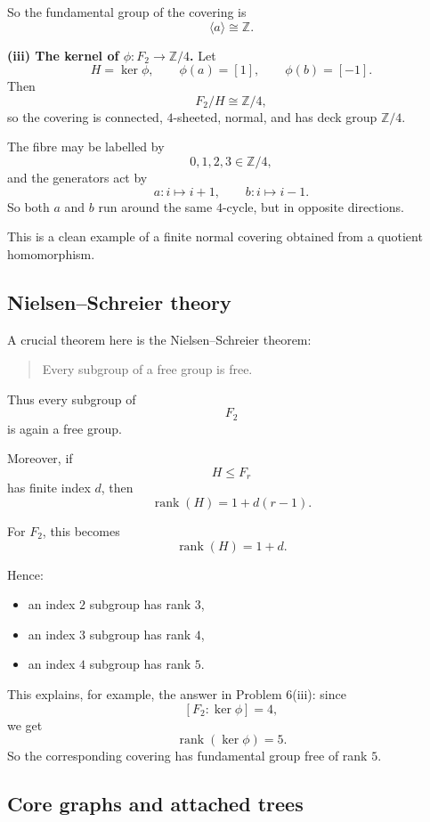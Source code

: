 \documentclass[12pt,a4paper]{article}
\theoremstyle{notespace}
\begin{document}
So the fundamental group of the covering is
\[
\langle a\rangle\cong \mathbb Z.
\]

\medskip

\textbf{(iii) The kernel of \(\phi:F_2\to \mathbb Z/4\).}
Let
\[
H=\ker\phi,
\qquad
\phi(a)=[1],\qquad \phi(b)=[-1].
\]
Then
\[
F_2/H\cong \mathbb Z/4,
\]
so the covering is connected, \(4\)-sheeted, normal, and has deck group \(\mathbb Z/4\).

The fibre may be labelled by
\[
0,1,2,3\in \mathbb Z/4,
\]
and the generators act by
\[
a:i\mapsto i+1,\qquad b:i\mapsto i-1.
\]
So both \(a\) and \(b\) run around the same \(4\)-cycle, but in opposite directions.

This is a clean example of a finite normal covering obtained from a quotient homomorphism.

\bigskip

\subsection{ Nielsen--Schreier theory}

A crucial theorem here is the Nielsen--Schreier theorem:
\begin{quote}
	Every subgroup of a free group is free.
\end{quote}

Thus every subgroup of
\[
F_2
\]
is again a free group.

Moreover, if
\[
H\leq F_r
\]
has finite index \(d\), then
\[
\operatorname{rank}(H)=1+d(r-1).
\]

For \(F_2\), this becomes
\[
\operatorname{rank}(H)=1+d.
\]

Hence:
\begin{itemize}
	\item an index \(2\) subgroup has rank \(3\),
	\item an index \(3\) subgroup has rank \(4\),
	\item an index \(4\) subgroup has rank \(5\).
\end{itemize}

This explains, for example, the answer in Problem 6(iii): since
\[
[F_2:\ker\phi]=4,
\]
we get
\[
\operatorname{rank}(\ker\phi)=5.
\]
So the corresponding covering has fundamental group free of rank \(5\).

\bigskip

\subsection{ Core graphs and attached trees}
\end{document}
